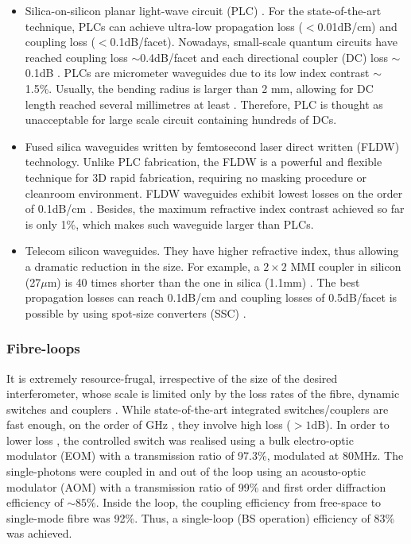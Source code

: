 \documentclass[aps,rmp,twocolumn,amsmath,amssymb,nofootinbib,superscriptaddress,longbibliography,floatfix,table-of-contents,eqsecnum]{revtex4-1}
\begin{document}
\begin{itemize}
    \item Silica-on-silicon planar light-wave circuit (PLC) \cite{hibino2003silica}. For the state-of-the-art technique, PLCs can achieve ultra-low propagation loss ($<$0.01dB/cm) and coupling loss ($<$0.1dB/facet). Nowadays, small-scale quantum circuits have reached coupling loss $\sim$0.4dB/facet and each directional coupler (DC) loss $\sim$0.1dB \cite{carolan2015universal}. PLCs are micrometer waveguides due to its low index contrast $\sim$1.5\%. Usually, the bending radius is larger than 2 mm, allowing for DC length reached several millimetres at least \cite{carolan2015universal}. Therefore, PLC is thought as unacceptable for large scale circuit containing hundreds of DCs.

    \item Fused silica waveguides written by femtosecond laser direct written (FLDW) technology. Unlike PLC fabrication, the FLDW is a powerful and flexible technique for 3D rapid fabrication, requiring no masking procedure or cleanroom environment. FLDW waveguides exhibit lowest losses on the order of 0.1dB/cm \cite{sakuma2003ultra}. Besides, the maximum refractive index contrast achieved so far is only 1\%, which makes such waveguide larger than PLCs.

    \item Telecom silicon waveguides. They have higher refractive index, thus allowing a dramatic reduction in the size. For example, a \mbox{$2\times 2$} MMI coupler in silicon (27$\mu$m) \cite{bonneau2012quantum} is 40 times shorter than the one in silica (1.1mm) \cite{peruzzo2011}. The best propagation losses can reach 0.1dB/cm \cite{lee2000, gnan2008} and coupling losses of 0.5dB/facet is possible by using spot-size converters (SSC) \cite{almeida2003, mcnab2003}.
\end{itemize}

%
%

\subsubsection{Fibre-loops}  

It is extremely resource-frugal, irrespective of the size of the desired interferometer, whose scale is limited only by the loss rates of the fibre, dynamic switches and couplers \cite{motes2014}. While state-of-the-art integrated switches/couplers are fast enough, on the order of GHz \cite{winzer2010, schindler2014}, they involve high loss ($>1$dB). In order to lower loss \cite{he2016}, the controlled switch was realised using a bulk electro-optic modulator (EOM) with a transmission ratio of 97.3\%, modulated at 80MHz. The single-photons were coupled in and out of the loop using an acousto-optic modulator (AOM) with a transmission ratio of 99\% and first order diffraction efficiency of $\sim 85\%$. Inside the loop, the coupling efficiency from free-space to single-mode fibre was 92\%. Thus, a single-loop (BS operation) efficiency of 83\% was achieved.
\end{document}
